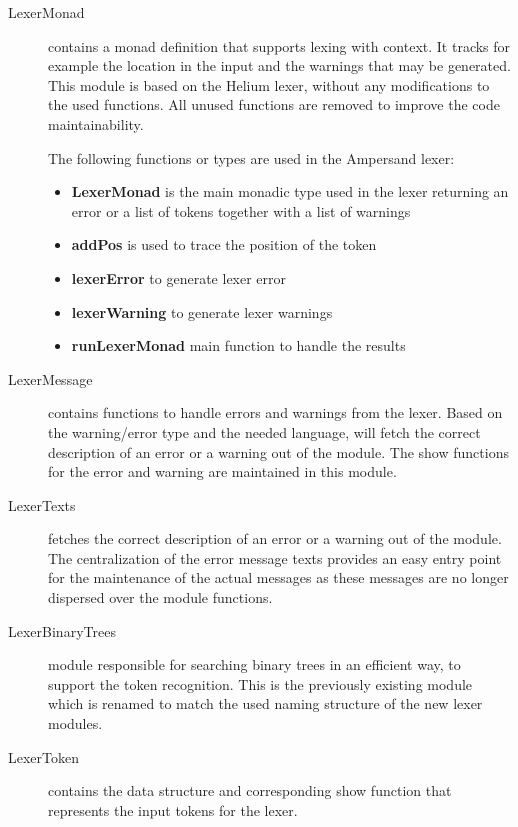  \begin{description}
 
    \item[LexerMonad] contains a monad definition that supports lexing with context.
      It tracks for example the location in the input and the warnings that may be generated.
      This module is based on the Helium lexer, without any modifications to the used functions.
      All unused functions are removed to improve the code maintainability.
      
      The following functions or types are used in the Ampersand lexer:
	  \begin{itemize}
		\item \textbf{LexerMonad} is the main monadic type used in the lexer returning an error or a list of tokens together with a list of warnings
		\item \textbf{addPos} is used to trace the position of the token
		\item \textbf{lexerError} to generate lexer error
		\item \textbf{lexerWarning} to generate lexer warnings
		\item \textbf{runLexerMonad} main function to handle the  results 
	  \end{itemize}
	  
    \item[LexerMessage] contains functions to handle errors and warnings from the lexer.
	  Based on the warning/error type and the needed language,  will fetch the correct description of an error or a warning out of the  module.
	  The show functions for the error and warning are maintained in this module.
	  
    \item[LexerTexts] fetches the correct description of an error or a warning out of the  module.
	  The centralization of the error message texts provides an easy entry point for the maintenance of the actual messages as these messages are no longer dispersed over the module functions.
	  
    \item[LexerBinaryTrees] module responsible for searching binary trees in an efficient way, to support the token recognition.
    This is the previously existing  module which is renamed to match the used naming structure of the new lexer modules.
    \item[LexerToken] contains the data structure and corresponding show function that represents the input tokens for the lexer.
	
  \end{description}


